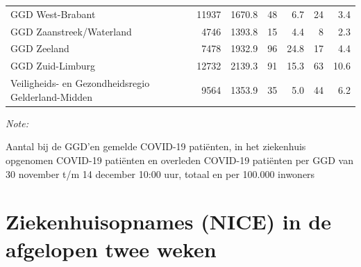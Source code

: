 \documentclass[
  english,
  man,floatsintext]{apa6}
\begin{document}
\begin{table}
\begin{threeparttable}
\begin{tabular}{lrrrrrr}
GGD West-Brabant & 11937 & 1670.8 & 48 & 6.7 & 24 & 3.4\\
GGD Zaanstreek/Waterland & 4746 & 1393.8 & 15 & 4.4 & 8 & 2.3\\
GGD Zeeland & 7478 & 1932.9 & 96 & 24.8 & 17 & 4.4\\
GGD Zuid-Limburg & 12732 & 2139.3 & 91 & 15.3 & 63 & 10.6\\
Veiligheids- en Gezondheidsregio Gelderland-Midden & 9564 & 1353.9 & 35 & 5.0 & 44 & 6.2\\
\bottomrule
\end{tabular}
\begin{tablenotes}
\item \textit{Note: } 
\item Aantal bij de GGD’en gemelde COVID-19 patiënten, in het ziekenhuis opgenomen COVID-19 patiënten en overleden COVID-19 patiënten per GGD van 30 november t/m 14 december 10:00 uur, totaal en per 100.000 inwoners
\end{tablenotes}
\end{threeparttable}
\endgroup{}
\end{table}

\newpage

\hypertarget{ziekenhuisopnames-nice-in-de-afgelopen-twee-weken}{%
\section{Ziekenhuisopnames (NICE) in de afgelopen twee weken}\label{ziekenhuisopnames-nice-in-de-afgelopen-twee-weken}}
\end{document}
